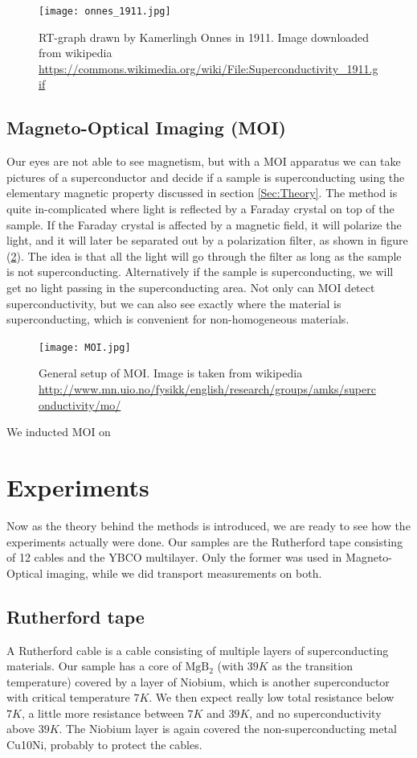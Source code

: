 \documentclass{comjnl}
\newcommand*\chem[1]{\ensuremath{\mathrm{#1}}}
\begin{document}
\begin{figure}[h]
\centering
\texttt{[image: onnes\_1911.jpg]}
\caption{RT-graph drawn by Kamerlingh Onnes in 1911. Image downloaded from wikipedia \url{https://commons.wikimedia.org/wiki/File:Superconductivity_1911.gif} \label{fig:onnes_1911}}
\end{figure}

\subsection{Magneto-Optical Imaging (MOI)}
Our eyes are not able to see magnetism, but with a MOI apparatus we can take pictures of a superconductor and decide if a sample is superconducting using the elementary magnetic property discussed in section \ref{Sec:Theory}. The method is quite in-complicated where light is reflected by a Faraday crystal on top of the sample. If the Faraday crystal is affected by a magnetic field, it will polarize the light, and it will later be separated out by a polarization filter, as shown in figure (\ref{fig:MOI}). The idea is that all the light will go through the filter as long as the sample is not superconducting. Alternatively if the sample is superconducting, we will get no light passing in the superconducting area. Not only can MOI detect superconductivity, but we can also see exactly where the material is superconducting, which is convenient for non-homogeneous materials. 
\begin{figure}[h]
\centering
\texttt{[image: MOI.jpg]}
\caption{General setup of MOI. Image is taken from wikipedia \url{http://www.mn.uio.no/fysikk/english/research/groups/amks/superconductivity/mo/} \label{fig:MOI}}
\end{figure}
We inducted MOI on 

\section{Experiments}\label{Sec:Experiments}
Now as the theory behind the methods is introduced, we are ready to see how the experiments actually were done. Our samples are the Rutherford tape consisting of 12 cables and the YBCO multilayer. Only the former was used in Magneto-Optical imaging, while we did transport measurements on both. 

\subsection{Rutherford tape}
A Rutherford cable is a cable consisting of multiple layers of superconducting materials. Our sample has a core of \chem{MgB_2} (with $39K$ as the transition temperature) covered by a layer of Niobium, which is another superconductor with critical temperature $7K$. We then expect really low total resistance below $7K$, a little more resistance between $7K$ and $39K$, and no superconductivity above $39K$. The Niobium layer is again covered the non-superconducting metal Cu10Ni, probably to protect the cables. 
\end{document}
